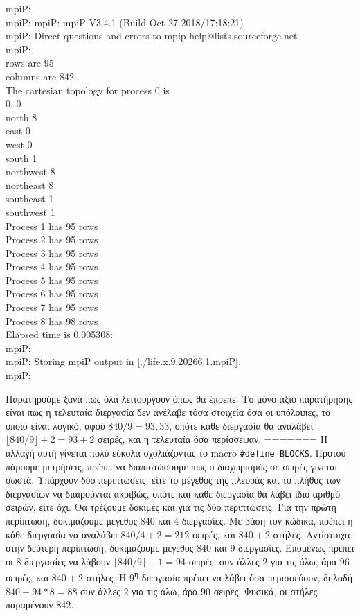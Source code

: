 \begin{tcolorbox}
mpiP: \\
mpiP: mpiP: mpiP V3.4.1 (Build Oct 27 2018/17:18:21) \\
mpiP: Direct questions and errors to mpip-help@lists.sourceforge.net \\
mpiP: \\
rows are 95 \\
columns are 842 \\

The cartesian topology for process 0 is \\
0, 0 \\
north 8 \\
east 0 \\
west 0 \\
south 1 \\
northwest 8 \\
northeast 8 \\
southeast 1 \\
southwest 1 \\

Process 1 has 95 rows \\
Process 2 has 95 rows \\
Process 3 has 95 rows \\
Process 4 has 95 rows \\
Process 5 has 95 rows \\
Process 6 has 95 rows \\
Process 7 has 95 rows \\
Process 8 has 98 rows \\
Elapsed time is 0.005308: \\
mpiP: \\
mpiP: Storing mpiP output in [./life.x.9.20266.1.mpiP]. \\
mpiP: \\
\end{tcolorbox}
Παρατηρούμε ξανά πως όλα λειτουργούν όπως θα έπρεπε. Το μόνο άξιο παρατήρησης είναι πως η τελευταία διεργασία δεν ανέλαβε τόσα στοιχεία όσα οι υπόλοιπες, το οποίο είναι λογικό, αφού $840 / 9 = 93,33$, οπότε κάθε διεργασία θα αναλάβει $\lfloor 840 / 9 \rfloor + 2 = 93 + 2$ σειρές, και η τελευταία όσα περίσσεψαν.
=======
Η αλλαγή αυτή γίνεται πολύ εύκολα σχολιάζοντας το macro \texttt{#define BLOCKS}. Προτού πάρουμε μετρήσεις, πρέπει να διαπιστώσουμε πως ο διαχωρισμός σε σειρές γίνεται σωστά. Υπάρχουν δύο περιπτώσεις, είτε το μέγεθος της πλευράς και το πλήθος των διεργασιών να διαιρούνται ακριβώς, οπότε και κάθε διεργασία θα λάβει ίδιο αριθμό σειρών, είτε όχι. Θα τρέξουμε δοκιμές και για τις δύο περιπτώσεις. Για την πρώτη περίπτωση, δοκιμάζουμε μέγεθος $840$ και $4$ διεργασίες. Με βάση τον κώδικα, πρέπει η κάθε διεργασία να αναλάβει $840 / 4 + 2 = 212$ σειρές, και $840 + 2$ στήλες. Αντίστοιχα στην δεύτερη περίπτωση, δοκιμάζουμε μέγεθος $840$ και $9$ διεργασίες. Επομένως πρέπει οι $8$ διεργασίες να λάβουν $\lceil 840 / 9 \rceil + 1 = 94$ σειρές, συν άλλες $2$ για τις άλω, άρα $96$ σειρές, και $840 + 2$ στήλες. Η 9\textsuperscript{η} διεργασία πρέπει να λάβει όσα περισσεύουν, δηλαδή $840 - 94 * 8 = 88$ συν άλλες $2$ για τις άλω, άρα $90$ σειρές. Φυσικά, οι στήλες παραμένουν $842$. \par
